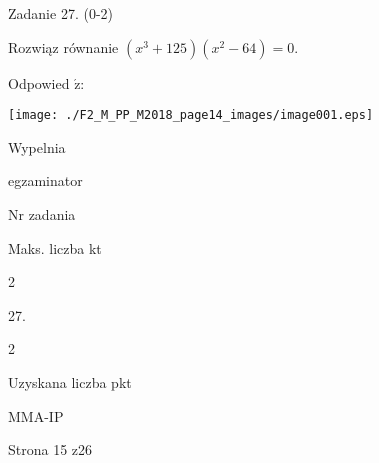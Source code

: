 \documentclass[a4paper,12pt]{article}
\begin{document}
Zadanie 27. (0-2)

Rozwiąz równanie $(x^{3}+125)(x^{2}-64)=0.$

Odpowied $\acute{\mathrm{z}}$:
\begin{center}
\texttt{[image: ./F2\_M\_PP\_M2018\_page14\_images/image001.eps]}
\end{center}
Wypelnia

egzaminator

Nr zadania

Maks. liczba kt

2

27.

2

Uzyskana liczba pkt

MMA-IP

Strona 15 z26
\end{document}
